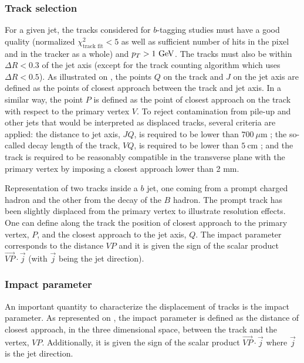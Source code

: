     \subsubsection{Track selection}

    For a given jet, the tracks considered for $b$-tagging studies must have
    a good quality (normalized $\chi^2_\text{track fit} < 5$ as well as sufficient number of hits in the
    pixel and in the tracker as a whole) and $p_T > 1~\text{GeV}$. The tracks must also be within
    $\Delta R < 0.3$ of the jet axis (except for the track counting algorithm which uses $\Delta R < 0.5$).
    As illustrated on , the points $Q$ on the track
    and $J$ on the jet axis are defined as the points of closest approach between the
    track and jet axis. In a similar way, the point $P$ is defined as the point of closest
    approach on the track with respect to the primary vertex $V$. To reject contamination
    from pile-up and other jets that would be interpreted as displaced tracks, several
    criteria are applied: the distance to jet axis, $JQ$, is required to be lower than
    $700~{\mu\text{m}}$ ; the so-called decay length of the track, $VQ$, is required to
    be lower than $5~\text{cm}$ ; and the track is required to be reasonably compatible
    in the transverse plane with the primary vertex by imposing a closest approach lower
    than 2 mm.

                 {Representation of two tracks inside a $b$ jet, one coming from a prompt
                 charged hadron and the other from the decay of
                 the $B$ hadron. The prompt track has been slightly displaced from the primary vertex
                 to illustrate resolution effects. One can define along the track the position
                 of closest approach to the primary vertex, $P$, and the closest approach
                 to the jet axis, $Q$. The impact parameter corresponds to the distance $VP$
                 and it is given the sign of the scalar product $\vec{VP} \cdot \vec{j}$ (with
                 $\vec{j}$ being the jet direction).}

    \subsubsection{Impact parameter}

    An important quantity to characterize the displacement of tracks is the impact parameter.
    As represented on , the impact parameter is defined
    as the distance of closest approach, in the three dimensional space, between the track
    and the vertex, $VP$. Additionally, it is given the sign of the scalar product $\vec{VP}
    \cdot \vec{j}$ where $\vec{j}$ is the jet direction.

